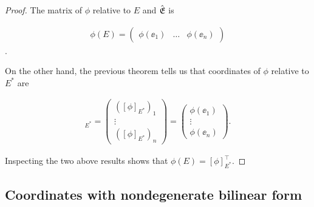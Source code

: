 \begin{proof}
    The matrix of $\phi$ relative to $E$ and ${\hat{\mathfrak{E}}}$ is
    
    \begin{align*}
        \phi(E) 
        = 
        \begin{pmatrix} 
            \phi(\ee_1) & \hdots & \phi(\ee_n)
        \end{pmatrix}
    \end{align*}.

    On the other hand, the previous theorem tells us that coordinates of $\phi$ relative to $E^*$ are
    
    \begin{align*}
        [\phi]_{E^*}
        =
        \begin{pmatrix} 
            ([\phi]_{E^*})_1 \\ \vdots \\ ([\phi]_{E^*})_n
        \end{pmatrix}
        =
        \begin{pmatrix} 
            \phi(\ee_1) \\ \vdots \\ \phi(\ee_n)
        \end{pmatrix}.
    \end{align*}
    
    Inspecting the two above results shows that $\phi(E) = [\phi]_{E^*}^\top$.
\end{proof}

\subsection*{Coordinates with nondegenerate bilinear form}

